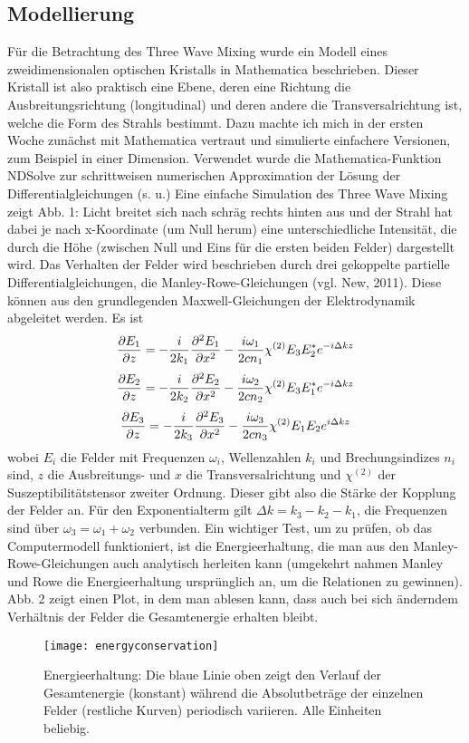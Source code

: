 \documentclass{article}
\begin{document}
\subsection{Modellierung}
F\"{u}r die Betrachtung des Three Wave Mixing wurde ein Modell eines zweidimensionalen optischen Kristalls in Mathematica beschrieben. Dieser Kristall ist also praktisch eine Ebene, deren eine Richtung die Ausbreitungsrichtung (longitudinal) und deren andere die Transversalrichtung ist, welche die Form des Strahls bestimmt. Dazu machte ich mich in der ersten Woche zun\"{a}chst mit Mathematica vertraut und simulierte einfachere Versionen, zum Beispiel in einer Dimension. Verwendet wurde die Mathematica-Funktion NDSolve zur schrittweisen numerischen Approximation der L\"{o}sung der Differentialgleichungen (s. u.) Eine einfache Simulation des Three Wave Mixing zeigt Abb. 1: Licht breitet sich nach schr\"{a}g rechts hinten aus und der Strahl hat dabei je nach x-Koordinate (um Null herum) eine unterschiedliche Intensit\"{a}t, die durch die H\"{o}he (zwischen Null und Eins f\"{u}r die ersten beiden Felder) dargestellt wird. Das Verhalten der Felder wird beschrieben durch drei gekoppelte partielle Differentialgleichungen, die Manley-Rowe-Gleichungen (vgl. New, 2011). Diese k\"{o}nnen aus den grundlegenden Maxwell-Gleichungen der Elektrodynamik abgeleitet werden. Es ist
\begin{equation}
\frac{\partial E_1} {\partial z}=-\frac{i}{2k_1} \pdv [2]{E_1}{x}-\frac{i \omega_1}{2 c n_1} \chi^{(2)}E_3 E_2^*e^{-i\Delta k z}
\end{equation}
\begin{equation}
\frac{\partial E_2} {\partial z}=-\frac{i}{2k_2} \pdv [2]{E_2}{x}-\frac{i \omega_2}{2 c n_2} \chi^{(2)}E_3 E_1^*e^{-i\Delta k z}
\end{equation}
\begin{equation}
\frac{\partial E_3} {\partial z}=-\frac{i}{2k_3} \pdv [2]{E_3}{x}-\frac{i \omega_3}{2 c n_3} \chi^{(2)}E_1 E_2 e^{i\Delta k z}
\end{equation}
wobei $E_i$ die Felder mit Frequenzen $\omega_i$, Wellenzahlen $k_i$ und Brechungsindizes $n_i$ sind, $z$ die Ausbreitungs- und $x$ die Transversalrichtung und $\chi^{(2)}$ der Suszeptibilit\"{a}tstensor zweiter Ordnung. Dieser gibt also die St\"{a}rke der Kopplung der Felder an. F\"{u}r den Exponentialterm gilt $\Delta k= k_3-k_2-k_1$, die Frequenzen sind \"{u}ber $\omega_3=\omega_1+\omega_2$ verbunden.
 Ein wichtiger Test, um zu pr\"{u}fen, ob das Computermodell funktioniert, ist die Energieerhaltung, die man aus den Manley-Rowe-Gleichungen auch analytisch herleiten kann (umgekehrt nahmen Manley und Rowe die Energieerhaltung urspr\"{u}nglich an, um die Relationen zu gewinnen). Abb. 2 zeigt einen Plot, in dem man ablesen kann, dass auch bei sich \"{a}nderndem Verh\"{a}ltnis der Felder die Gesamtenergie erhalten bleibt. 
\begin{figure}[h]
\texttt{[image: energyconservation]}
\caption{Energieerhaltung: Die blaue Linie oben zeigt den Verlauf der Gesamtenergie (konstant) w\"{a}hrend die Absolutbetr\"{a}ge der einzelnen Felder (restliche Kurven) periodisch variieren. Alle Einheiten beliebig.}
\end{figure}
\end{document}
